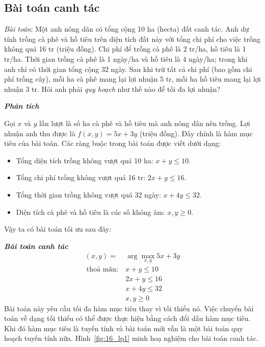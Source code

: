 
 
\subsection{Bài toán canh tác}
 
\textit{{Bài toán}}:
Một anh nông dân có tổng cộng 10 ha (hecta) đất canh tác. Anh dự tính trồng cà
phê và hồ tiêu trên diện tích đất này với tổng chi phí cho việc trồng không quá 16 tr (triệu đồng). Chi phí để trồng cà phê là 2 tr/ha, hồ
tiêu là 1 tr/ha. Thời gian trồng cà phê là 1 ngày/ha và hồ tiêu là 4 ngày/ha;
trong khi anh chỉ có thời gian tổng cộng 32 ngày. Sau khi trừ tất cả chi
phí (bao gồm chi phí trồng cây), mỗi ha cà phê mang lại lợi nhuận 5 tr, mỗi ha hồ
tiêu mang lại lợi nhuận 3 tr. Hỏi anh phải \textit{quy hoạch} như thế nào để tối
đa lợi nhuận? 
 
\newpage 
\textit{\textbf{Phân tích}}

Gọi $x$ và $y$ lần lượt là số ha cà phê và hồ tiêu mà anh nông dân nên trồng.
Lợi nhuận anh thu được là $f(x, y) = 5x + 3y$ (triệu đồng). Đây chính là hàm
mục tiêu của bài toán. Các ràng buộc trong bài toán được viết dưới dạng:
\begin{itemize}
    \item Tổng diện tích trồng không vượt quá 10 ha: $x + y \leq 10$. 
     
    \item Tổng chi phí trồng không vượt quá 16 tr: $2x + y \leq 16$. 
     
    \item Tổng thời gian trồng không vượt quá 32 ngày: $x + 4y \leq 32$. 
     
    \item Diện tích cà phê và hồ tiêu là các số không âm: $x, y \geq 0$. 
\end{itemize}
Vậy ta có bài toán tối ưu sau đây: 


\textit{\textbf{Bài toán canh tác} }
\begin{equation}
\label{eqn:canhtac}
\begin{aligned}
    (x, y) =& \arg\max_{x, y} 5x + 3y \\\ 
    \text{thoả mãn:}~ & x + y \leq 10 \\\ 
                        & 2x + y \leq 16 \\\ 
                        & x + 4y \leq 32 \\\ 
                        & x, y \geq 0 
\end{aligned} 
\end{equation} 
Bài toán này yêu cầu {tối đa hàm mục tiêu} thay vì tối thiểu nó. Việc
chuyển bài toán về dạng {tối thiểu}  có thể được thực hiện bằng cách đổi dấu hàm mục tiêu. Khi đó hàm mục tiêu là tuyến tính và bài toán mới vẫn là một bài toán quy hoạch tuyến tính
nữa. Hình~\ref{fig:16_lp1} minh hoạ nghiệm cho bài toán canh tác. 


